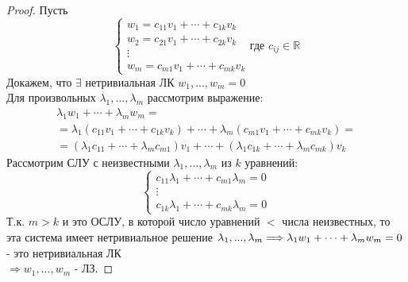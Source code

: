 \documentclass[a4paper, 12pt]{article}
\newcommand{\R}{\mathbb R}
\theoremstyle{definition}
\begin{document}
  \begin{proof}
    Пусть 
    $$\begin{cases}
      w_1 = c_{11}v_1+\cdots+c_{1k}v_k \\
      w_2 = c_{21}v_1+\cdots+c_{2k}v_k \\
      \vdots \\
      w_m = c_{m1}v_1+\cdots+c_{mk}v_k
    \end{cases}
    \text{где } c_{ij} \in \R
    $$
    Докажем, что $\exists$ нетривиальная ЛК $w_1,...,w_m=0$ \\
    Для произвольных $\lambda_1,...,\lambda_m$ рассмотрим выражение: 
    \begin{multline*}
      \lambda_1w_1 +\cdots+\lambda_mw_m = \\ = \lambda_1(c_{11}v_1+\cdots+c_{1k}v_k) + \cdots + \lambda_m(c_{m1}v_1+\cdots+c_{mk}v_k) = \\ = (\lambda_1c_{11}+\cdots+\lambda_mc_{m1})v_1+\cdots+(\lambda_1c_{1k}+\cdots+\lambda_mc_{mk})v_k 
    \end{multline*}
    Рассмотрим СЛУ с неизвестными $\lambda_1,...,\lambda_m$ из $k$ уравнений:
    $$\begin{cases}
      c_{11}\lambda_1+\cdots+c_{m1}\lambda_m=0 \\
      \vdots \\
      c_{1k}\lambda_1+\cdots+c_{mk}\lambda_m=0
    \end{cases}$$ 
    Т.к. $m>k$ и это ОСЛУ, в которой число уравнений $<$ числа неизвестных, то эта система имеет нетривиальное решение 
    $\lambda_1,...,\lambda_m \\ \Longrightarrow \lambda_1w_1+\cdots+\lambda_mw_m = 0$ - это нетривиальная ЛК \\ $\Longrightarrow w_1,...,w_m$ - ЛЗ. 
  \end{proof} 
\end{document}
